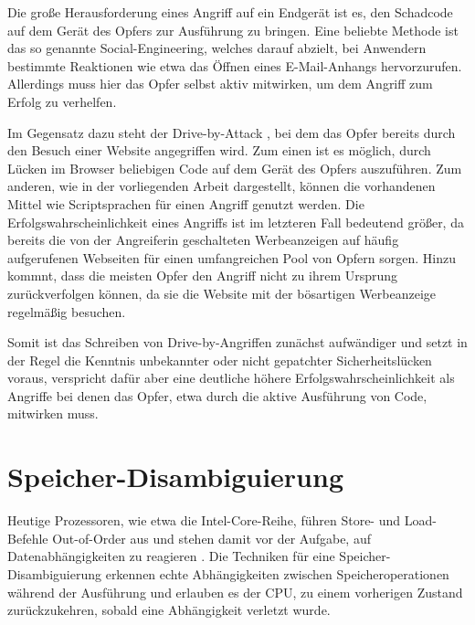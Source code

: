 Die große Herausforderung eines Angriff auf ein Endgerät ist es, den Schadcode auf dem Gerät des Opfers zur Ausführung zu bringen. Eine beliebte Methode ist das so genannte Social-Engineering, welches darauf abzielt, bei Anwendern bestimmte Reaktionen wie etwa das Öffnen eines E-Mail-Anhangs hervorzurufen. Allerdings muss hier das Opfer selbst aktiv mitwirken, um dem Angriff zum Erfolg zu verhelfen.

Im Gegensatz dazu steht der Drive-by-Attack \cite{DriveByAttacksGeneric}, bei dem das Opfer bereits durch den Besuch einer Website angegriffen wird. Zum einen ist es möglich, durch Lücken im Browser beliebigen Code auf dem Gerät des Opfers auszuführen. Zum anderen, wie in der vorliegenden Arbeit dargestellt, können die vorhandenen Mittel wie Scriptsprachen für einen Angriff genutzt werden.
Die Erfolgswahrscheinlichkeit eines Angriffs ist im letzteren Fall bedeutend größer, da bereits die von der Angreiferin geschalteten Werbeanzeigen auf häufig aufgerufenen Webseiten für einen umfangreichen Pool von Opfern sorgen.
Hinzu kommnt, dass die meisten Opfer den Angriff nicht zu ihrem Ursprung zurückverfolgen können, da sie die Website mit der bösartigen Werbeanzeige regelmäßig besuchen.

Somit ist das Schreiben von Drive-by-Angriffen zunächst aufwändiger und setzt in der Regel die Kenntnis unbekannter oder nicht gepatchter Sicherheitslücken voraus, verspricht dafür aber eine deutliche höhere Erfolgswahrscheinlichkeit als Angriffe bei denen das Opfer, etwa durch die aktive Ausführung von Code, mitwirken muss.




\section{Speicher-Disambiguierung}

Heutige Prozessoren, wie etwa die Intel-Core-Reihe, führen Store- und Load-Befehle Out-of-Order aus und stehen damit vor der Aufgabe, auf Datenabhängigkeiten 
zu reagieren \cite{memoryDisambiguationBlog}.
Die Techniken für eine Speicher-Disambiguierung erkennen echte Abhängigkeiten zwischen Speicheroperationen während der Ausführung und erlauben es der CPU, zu einem vorherigen Zustand zurückzukehren, sobald eine Abhängigkeit verletzt wurde.

